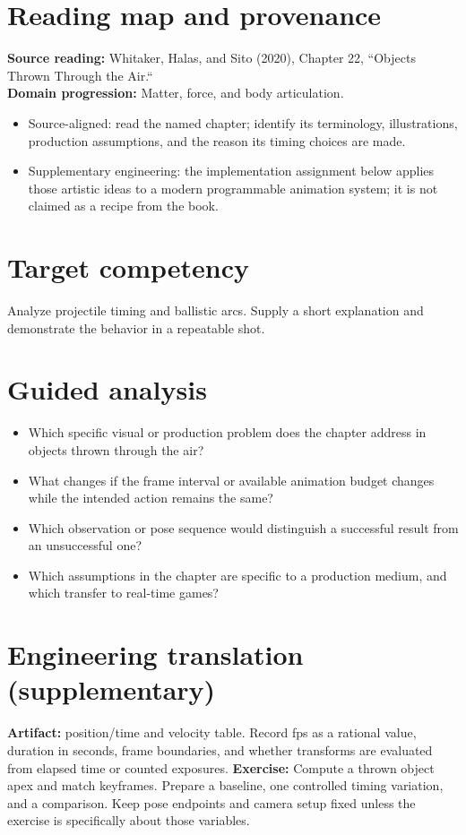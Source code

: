 \documentclass[10pt,letterpaper]{article}
\begin{document}
\makedoctitle
\makedocsummary

\section{Reading map and provenance}
\textbf{Source reading:} Whitaker, Halas, and Sito (2020), Chapter 22, ``Objects Thrown Through the Air.``\\
\textbf{Domain progression:} Matter, force, and body articulation.
\begin{itemize}
\item Source-aligned: read the named chapter; identify its terminology, illustrations, production assumptions, and the reason its timing choices are made.
\item Supplementary engineering: the implementation assignment below applies those artistic ideas to a modern programmable animation system; it is not claimed as a recipe from the book.
\end{itemize}
\section{Target competency}
Analyze projectile timing and ballistic arcs. Supply a short explanation and demonstrate the behavior in a repeatable shot.
\section{Guided analysis}
\begin{itemize}
\item Which specific visual or production problem does the chapter address in objects thrown through the air?
\item What changes if the frame interval or available animation budget changes while the intended action remains the same?
\item Which observation or pose sequence would distinguish a successful result from an unsuccessful one?
\item Which assumptions in the chapter are specific to a production medium, and which transfer to real-time games?
\end{itemize}
\section{Engineering translation (supplementary)}
\textbf{Artifact:} position/time and velocity table. Record fps as a rational value, duration in seconds, frame boundaries, and whether transforms are evaluated from elapsed time or counted exposures.
\textbf{Exercise:} Compute a thrown object apex and match keyframes. Prepare a baseline, one controlled timing variation, and a comparison. Keep pose endpoints and camera setup fixed unless the exercise is specifically about those variables.
\end{document}
